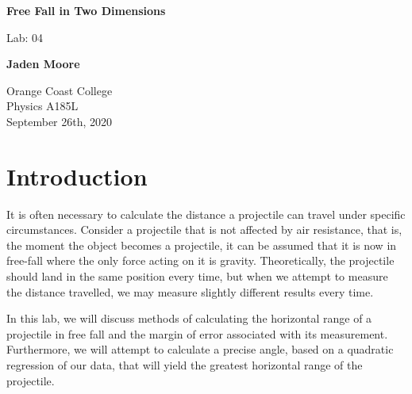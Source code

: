 \documentclass[12pt]{article}
\begin{document}

\begin{titlepage}
    \begin{center}
        \vspace*{1cm}
        \textbf{Free Fall in Two Dimensions}

        \vspace{0.5cm}
        Lab: 04

        \vspace{1cm}

        \textbf{Jaden Moore}

        \vfill

        Orange Coast College\\
        Physics A185L\\
        September 26th, 2020

    \end{center}
\end{titlepage}

\pagestyle{fancy}
\fancyhf{}
\setlength{\headheight}{15pt}
\cfoot{\thepage}



\section{Introduction}
It is often necessary to calculate the distance a projectile can travel under specific circumstances. Consider a projectile that is not affected by air resistance, that is, the moment the object becomes a projectile, it can be assumed that it is now in free-fall where the only force acting on it is gravity. Theoretically, the projectile should land in the same position every time, but when we attempt to measure the distance travelled, we may measure slightly different results every time.

In this lab, we will discuss methods of calculating the  horizontal range of a projectile in free fall and the margin of error associated with its measurement. Furthermore, we will attempt to calculate a precise angle, based on a quadratic regression of our data, that will yield the greatest horizontal range of the projectile.
\end{document}
